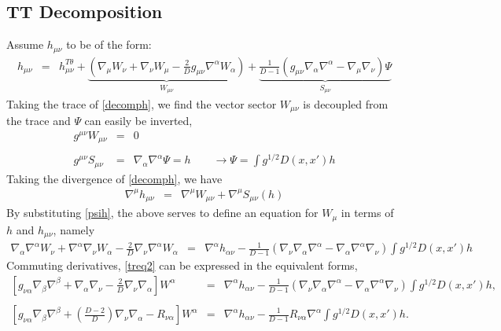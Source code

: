 \documentclass[10pt,letterpaper]{article}
\numberwithin{equation}{section}
\begin{document}
\subsection{TT Decomposition}
%
Assume $h_{\mu\nu}$ to be of the form:
\begin{eqnarray}
h_{\mu\nu} &=& h_{\mu\nu}^{T\theta} + \underbrace{\left(\nabla_\mu W_\nu + \nabla_\nu W_\mu - \frac{2}{D}g_{\mu\nu}\nabla^\alpha W_\alpha\right)}_{W_{\mu\nu}} + \underbrace{\frac{1}{D-1}\left( g_{\mu\nu}\nabla_\alpha \nabla^\alpha - \nabla_\mu\nabla_\nu\right)\Psi}_{S_{\mu\nu}}
\label{decomph}
\end{eqnarray}
Taking the trace of \eqref{decomph}, we find the vector sector $W_{\mu\nu}$ is decoupled from the trace and $\Psi$ can easily be inverted,
\begin{eqnarray}
g^{\mu\nu}W_{\mu\nu} &=& 0
\\ \nonumber\\
g^{\mu\nu}S_{\mu\nu} &=& \nabla_\alpha\nabla^\alpha \Psi = h
\qquad
\to \Psi = \int g^{1/2} D(x,x') h
\label{psih}
\end{eqnarray}
Taking the divergence of \eqref{decomph}, we have
\begin{eqnarray}
\nabla^\mu h_{\mu\nu} &=& \nabla^\mu W_{\mu\nu} + \nabla^\mu S_{\mu\nu}(h)
\label{treq1}
\end{eqnarray}
By substituting \eqref{psih}, the above serves to define an equation for $W_{\mu}$ in terms of $h$ and $h_{\mu\nu}$, namely
\begin{eqnarray}
\nabla_\alpha \nabla^\alpha W_\nu +\nabla^\alpha \nabla_\nu W_\alpha - \frac{2}{D}\nabla_\nu\nabla^\alpha W_\alpha &=&
\nabla^\alpha h_{\alpha\nu} - \frac{1}{D-1}\left(\nabla_\nu \nabla_\alpha\nabla^\alpha - \nabla_\alpha\nabla^\alpha \nabla_\nu\right)
\int g^{1/2} D(x,x') h
\label{treq2}
\end{eqnarray}
Commuting derivatives, \eqref{treq2} can be expressed in the equivalent forms,
\begin{eqnarray}
\left[g_{\nu\alpha} \nabla_\beta \nabla^\beta +\nabla_\alpha \nabla_\nu - \frac{2}{D}\nabla_\nu\nabla_\alpha\right] W^\alpha &=&
\nabla^\alpha h_{\alpha\nu} - \frac{1}{D-1}\left(\nabla_\nu \nabla_\alpha\nabla^\alpha - \nabla_\alpha\nabla^\alpha \nabla_\nu\right)
\int g^{1/2} D(x,x') h,
\label{treq3}
\\ \nonumber\\
\left[g_{\nu\alpha}\nabla_\beta\nabla^\beta + \left(\frac{D-2}{D}\right)\nabla_\nu \nabla_\alpha - R_{\nu\alpha}\right]W^\alpha
&=& \nabla^\alpha h_{\alpha\nu} - \frac{1}{D-1}R_{\nu\alpha}\nabla^\alpha \int g^{1/2} D(x,x') h.
\label{treq4}
\end{eqnarray}
\end{document}
